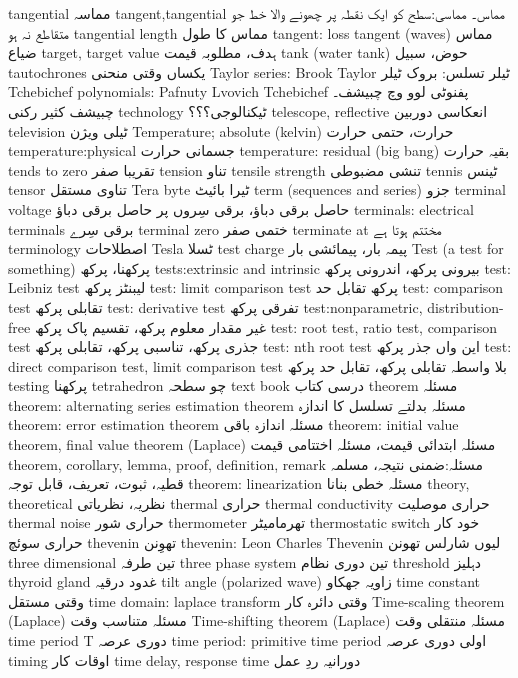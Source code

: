 tangential	مماسہ
tangent,tangential	مماس۔ مماسی:سطح کو ایک نقطہ پر چھونے والا خط جو متقاطع نہ ہو
tangential length	مماس کا طول
tangent: loss tangent (waves)	مماس ضیاع
target, target value	ہدف، مطلوبہ قیمت
tank (water tank)	حوض، سبیل
tautochrones	یکساں وقتی منحنی
Taylor series: Brook Taylor	ٹیلر تسلس: بروک ٹیلر
Tchebichef polynomials: Pafnuty Lvovich Tchebichef	پفنوٹی لوو وچ چبیشف۔  چبیشف کثیر رکنی
technology	ٹیکنالوجی؟؟؟
telescope, reflective	انعکاسی دوربین
television	ٹیلی ویژن
Temperature; absolute (kelvin)	حرارت، حتمی حرارت
temperature:physical	جسمانی حرارت
temperature: residual (big bang)	بقیہ حرارت
tends to zero	تقریبا صفر
tension	تناو
tensile strength	تنشی مضبوطی
tennis	ٹینس
tensor	تناوی مستقل
Tera byte	ٹیرا بائیٹ
term (sequences and series)	جزو
terminal voltage	حاصل برقی دباؤ، برقی سِروں پر حاصل برقی دباؤ
terminals: electrical terminals	برقی سِرے
terminal zero	ختمی صفر
terminate at	مختتم ہوتا ہے
terminology	اصطلاحات
Tesla	ٹسلا
test charge	پیمہ بار، پیمائشی بار
Test (a test for something)	پرکھنا، پرکھ
tests:extrinsic and intrinsic	بیرونی پرکھ، اندرونی پرکھ
test: Leibniz test	لیبنٹز پرکھ
test: limit comparison test	پرکھ تقابل حد
test: comparison test	تقابلی پرکھ
test: derivative test	تفرقی پرکھ
test:nonparametric, distribution-free	غیر مقدار معلوم پرکھ، تقسیم پاک پرکھ
test: root test, ratio test, comparison test	جذری پرکھ، تناسبی پرکھ، تقابلی پرکھ
test: nth root test	این واں جذر پرکھ
test: direct comparison test, limit comparison test	بلا واسطہ تقابلی پرکھ، تقابل حد پرکھ
testing	پرکھنا
tetrahedron	چو سطحہ
text book	درسی کتاب
theorem	مسئلہ
theorem: alternating series estimation theorem	مسئلہ بدلتے تسلسل کا اندازہ
theorem: error estimation theorem	مسئلہ اندازہ باقی
theorem: initial value theorem, final value theorem (Laplace)	مسئلہ ابتدائی قیمت، مسئلہ اختتامی قیمت
theorem, corollary, lemma, proof, definition, remark	مسئلہ:ضمنی نتیجہ، مسلمہ قطیہ، ثبوت، تعریف، قابل توجہ
theorem: linearization	مسئلہ خطی بنانا
theory, theoretical	نظریہ، نظریاتی
thermal	حراری
thermal conductivity	حراری موصلیت
thermal noise	حراری شور
thermometer	تھرمامیٹر
thermostatic switch	خود کار حراری سوئچ
thevenin	تھوِنن
thevenin: Leon Charles Thevenin	لیوں شارلس تھونن
three dimensional	تین طرفہ
three phase system	تین دوری نظام
threshold	دہلیز
thyroid gland	غدود درقیہ
tilt angle (polarized wave)	زاویہ جھکاو
time constant	وقتی مستقل
time domain: laplace transform	وقتی دائرہ کار
Time-scaling theorem (Laplace)	مسئلہ متناسب وقت
Time-shifting theorem (Laplace)	مسئلہ منتقلی وقت
time period T	دوری عرصہ 
time period: primitive time period	اولی دوری عرصہ
timing	اوقات کار
time delay, response time	دورانیہ ردِ عمل
